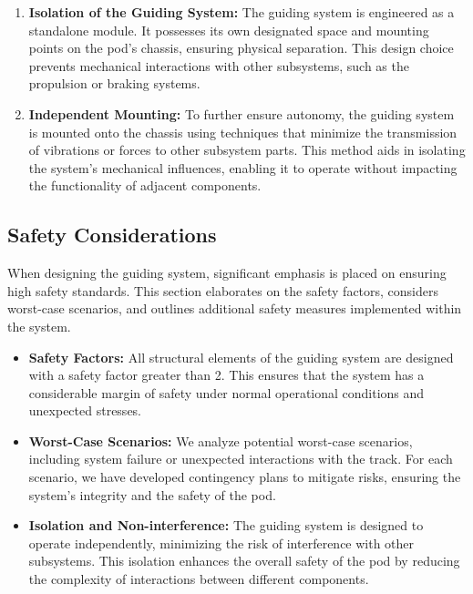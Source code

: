 \begin{enumerate}
    \item \textbf{Isolation of the Guiding System:} The guiding system is engineered as a standalone module. It possesses its own designated space and mounting points on the pod's chassis, ensuring physical separation. This design choice prevents mechanical interactions with other subsystems, such as the propulsion or braking systems.
    
    \item \textbf{Independent Mounting:} To further ensure autonomy, the guiding system is mounted onto the chassis using techniques that minimize the transmission of vibrations or forces to other subsystem parts. This method aids in isolating the system's mechanical influences, enabling it to operate without impacting the functionality of adjacent components.
   \end{enumerate}
\subsection{Safety Considerations}
When designing the guiding system, significant emphasis is placed on ensuring high safety standards. This section elaborates on the safety factors, considers worst-case scenarios, and outlines additional safety measures implemented within the system.

\begin{itemize}
    \item \textbf{Safety Factors:} All structural elements of the guiding system are designed with a safety factor greater than 2. This ensures that the system has a considerable margin of safety under normal operational conditions and unexpected stresses.
    
    \item \textbf{Worst-Case Scenarios:} We analyze potential worst-case scenarios, including system failure or unexpected interactions with the track. For each scenario, we have developed contingency plans to mitigate risks, ensuring the system's integrity and the safety of the pod.
    
    \item \textbf{Isolation and Non-interference:} The guiding system is designed to operate independently, minimizing the risk of interference with other subsystems. This isolation enhances the overall safety of the pod by reducing the complexity of interactions between different components.
    


\end{itemize}


